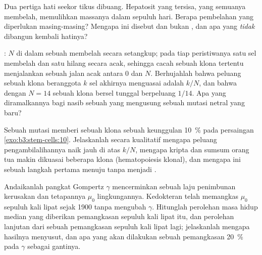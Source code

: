 \begin{exercise}[$\star\star$]\label{exo:b3:stem-cells:9}
Dua pertiga hati seekor tikus dibuang. Hepatosit yang tersisa, yang
semuanya membelah, memulihkan massanya dalam sepuluh hari. Berapa pembelahan yang
diperlukan masing-masing? Mengapa ini disebut  dan bukan ,
dan apa yang \emph{tidak} dibangun kembali hatinya?
\end{exercise}

\begin{exercise}[$\star\star\star$]\label{exo:b3:stem-cells:10}
: $N$  di dalam sebuah  membelah secara setangkup; pada tiap
peristiwanya satu sel membelah dan satu hilang secara acak, sehingga cacah sebuah
klona tertentu menjalankan sebuah jalan acak antara $0$ dan $N$. Berhujahlah bahwa
peluang sebuah klona beranggota $k$ sel akhirnya menguasai  adalah
$k/N$, dan bahwa dengan $N = 14$ sebuah klona bersel tunggal berpeluang $1/14$.
Apa yang diramalkannya bagi nasib sebuah  yang mengusung sebuah mutasi
netral yang baru?
\end{exercise}

\begin{exercise}[$\star\star\star$]\label{exo:b3:stem-cells:11}
Sebuah mutasi memberi sebuah klona  sebuah keunggulan \qty{10}{\%} pada
persaingan \cref{exo:b3:stem-cells:10}. Jelaskanlah secara kualitatif mengapa
peluang pengambilalihannya naik jauh di atas $k/N$, mengapa kripta dan sumsum
orang tua makin dikuasai beberapa klona (hematopoiesis klonal), dan
mengapa ini sebuah langkah pertama menuju  tanpa
menjadi .
\end{exercise}

\begin{exercise}[$\star\star\star$]\label{exo:b3:stem-cells:12}
Andaikanlah pangkat Gompertz $\gamma$ mencerminkan sebuah laju penimbunan
kerusakan dan tetapannya $\mu_{0}$ lingkungannya. Kedokteran telah memangkas
$\mu_{0}$ sepuluh kali lipat sejak 1900 tanpa mengubah $\gamma$. Hitunglah perolehan
masa hidup median yang diberikan pemangkasan sepuluh kali lipat itu, dan perolehan lanjutan
dari sebuah pemangkasan sepuluh kali lipat lagi; jelaskanlah mengapa hasilnya menyusut, dan apa yang akan
dilakukan sebuah pemangkasan \qty{20}{\%} pada $\gamma$ sebagai gantinya.
\end{exercise}

